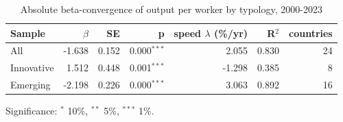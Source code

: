 \begin{table}[htbp]
\centering\small
\caption{Absolute beta-convergence of output per worker by typology, 2000-2023}
\label{tab:beta}
\begin{tabular}{lrrrrrr}
\toprule
Sample & $\beta$ & SE & p & speed $\lambda$ (\%/yr) & R$^2$ & countries \\
\midrule
All & -1.638 & 0.152 & 0.000$^{***}$ & 2.055 & 0.830 & 24 \\
Innovative & 1.512 & 0.448 & 0.001$^{***}$ & -1.298 & 0.385 & 8 \\
Emerging & -2.198 & 0.226 & 0.000$^{***}$ & 3.063 & 0.892 & 16 \\
\bottomrule
\end{tabular}
\par\footnotesize Significance: $^{*}$ 10\%, $^{**}$ 5\%, $^{***}$ 1\%.
\end{table}
